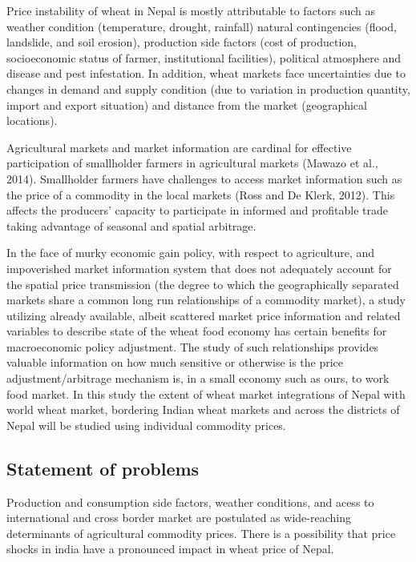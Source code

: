 \documentclass[12pt,]{article}
\begin{document}
Price instability of wheat in Nepal is mostly attributable to factors such as weather condition (temperature, drought, rainfall) natural contingencies (flood, landslide, and soil erosion), production side factors (cost of production, socioeconomic status of farmer, institutional facilities), political atmosphere and disease and pest infestation. In addition, wheat markets face uncertainties due to changes in demand and supply condition (due to variation in production quantity, import and export situation) and distance from the market (geographical locations).

Agricultural markets and market information are cardinal for effective participation of smallholder farmers in agricultural markets (Mawazo et al., 2014). Smallholder farmers have challenges to access market information such as the price of a commodity in the local markets (Ross and De Klerk, 2012). This affects the producers' capacity to participate in informed and profitable trade taking advantage of seasonal and spatial arbitrage.

In the face of murky economic gain policy, with respect to agriculture, and impoverished market information system that does not adequately account for the spatial price transmission (the degree to which the geographically separated markets share a common long run relationships of a commodity market), a study utilizing already available, albeit scattered market price information and related variables to describe state of the wheat food economy has certain benefits for macroeconomic policy adjustment. The study of such relationships provides valuable information on how much sensitive or otherwise is the price adjustment/arbitrage mechanism is, in a small economy such as ours, to work food market. In this study the extent of wheat market integrations of Nepal with world wheat market, bordering Indian wheat markets and across the districts of Nepal will be studied using individual commodity prices.

\hypertarget{statement-of-problems}{%
\subsection{Statement of problems}\label{statement-of-problems}}

Production and consumption side factors, weather conditions, and acess to international and cross border market are postulated as wide-reaching determinants of agricultural commodity prices. There is a possibility that price shocks in india have a pronounced impact in wheat price of Nepal.
\end{document}
